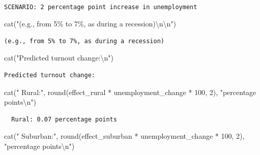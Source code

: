 \documentclass[
  11pt,
]{article}
\newenvironment{Shaded}{\begin{snugshade}}{\end{snugshade}}
\newcommand{\DecValTok}[1]{\textcolor[rgb]{0.68,0.00,0.00}{#1}}
\newcommand{\FunctionTok}[1]{\textcolor[rgb]{0.28,0.35,0.67}{#1}}
\newcommand{\NormalTok}[1]{\textcolor[rgb]{0.00,0.23,0.31}{#1}}
\newcommand{\SpecialCharTok}[1]{\textcolor[rgb]{0.37,0.37,0.37}{#1}}
\newcommand{\StringTok}[1]{\textcolor[rgb]{0.13,0.47,0.30}{#1}}
\begin{document}
\begin{verbatim}

SCENARIO: 2 percentage point increase in unemployment
\end{verbatim}

\begin{Shaded}
\begin{Highlighting}[]
\FunctionTok{cat}\NormalTok{(}\StringTok{"(e.g., from 5\% to 7\%, as during a recession)}\SpecialCharTok{\textbackslash{}n\textbackslash{}n}\StringTok{"}\NormalTok{)}
\end{Highlighting}
\end{Shaded}

\begin{verbatim}
(e.g., from 5% to 7%, as during a recession)
\end{verbatim}

\begin{Shaded}
\begin{Highlighting}[]
\FunctionTok{cat}\NormalTok{(}\StringTok{"Predicted turnout change:}\SpecialCharTok{\textbackslash{}n}\StringTok{"}\NormalTok{)}
\end{Highlighting}
\end{Shaded}

\begin{verbatim}
Predicted turnout change:
\end{verbatim}

\begin{Shaded}
\begin{Highlighting}[]
\FunctionTok{cat}\NormalTok{(}\StringTok{"  Rural:"}\NormalTok{, }\FunctionTok{round}\NormalTok{(effect\_rural }\SpecialCharTok{*}\NormalTok{ unemployment\_change }\SpecialCharTok{*} \DecValTok{100}\NormalTok{, }\DecValTok{2}\NormalTok{), }\StringTok{"percentage points}\SpecialCharTok{\textbackslash{}n}\StringTok{"}\NormalTok{)}
\end{Highlighting}
\end{Shaded}

\begin{verbatim}
  Rural: 0.07 percentage points
\end{verbatim}

\begin{Shaded}
\begin{Highlighting}[]
\FunctionTok{cat}\NormalTok{(}\StringTok{"  Suburban:"}\NormalTok{, }\FunctionTok{round}\NormalTok{(effect\_suburban }\SpecialCharTok{*}\NormalTok{ unemployment\_change }\SpecialCharTok{*} \DecValTok{100}\NormalTok{, }\DecValTok{2}\NormalTok{), }\StringTok{"percentage points}\SpecialCharTok{\textbackslash{}n}\StringTok{"}\NormalTok{)}
\end{Highlighting}
\end{Shaded}
\end{document}
